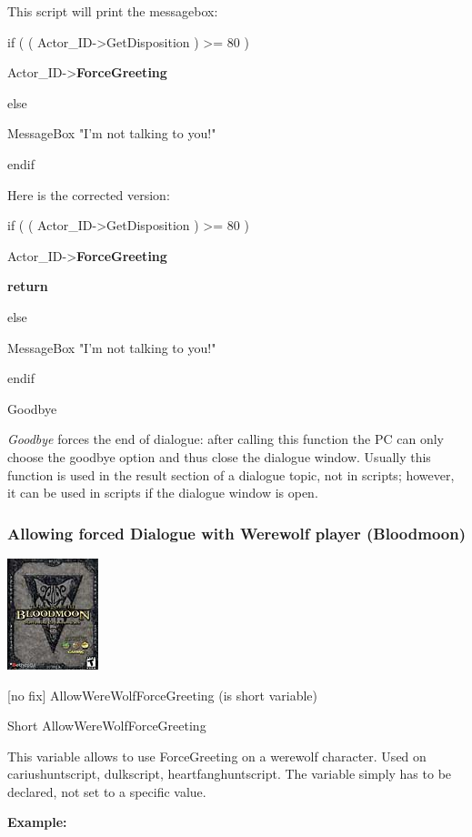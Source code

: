 \documentclass[
]{article}
\begin{document}
This script will print the messagebox:

if ( ( Actor\_ID-\textgreater GetDisposition ) \textgreater= 80 )

Actor\_ID-\textgreater{}\textbf{ForceGreeting}

else

MessageBox "I'm not talking to you!"

endif

Here is the corrected version:

if ( ( Actor\_ID-\textgreater GetDisposition ) \textgreater= 80 )

Actor\_ID-\textgreater{}\textbf{ForceGreeting~}

\textbf{return}

else

MessageBox "I'm not talking to you!"

endif

Goodbye

\emph{Goodbye} forces the end of dialogue: after calling this function
the PC can only choose the goodbye option and thus close the dialogue
window. Usually this function is used in the result section of a
dialogue topic, not in scripts; however, it can be used in scripts if
the dialogue window is open.

\hypertarget{allowing-forced-dialogue-with-werewolf-player-bloodmoon}{%
\subsubsection{Allowing forced Dialogue with Werewolf player
(Bloodmoon)}\label{allowing-forced-dialogue-with-werewolf-player-bloodmoon}}

\includegraphics{media/image7.png}

{[}no fix{]} AllowWereWolfForceGreeting (is short variable)

Short AllowWereWolfForceGreeting

This variable allows to use ForceGreeting on a werewolf character. Used
on cariushuntscript, dulkscript, heartfanghuntscript. The variable
simply has to be declared, not set to a specific value.

\textbf{Example:}
\end{document}
